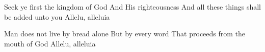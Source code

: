 Seek ye first the kingdom of God
And His righteousness
And all these things shall be added unto you
Allelu, alleluia

\endverse                         

\beginverse                       
\chordsoff  								%

Man does not live by bread alone
But by every word
That proceeds from the mouth of God
Allelu, alleluia

\endverse                         



\endsong
